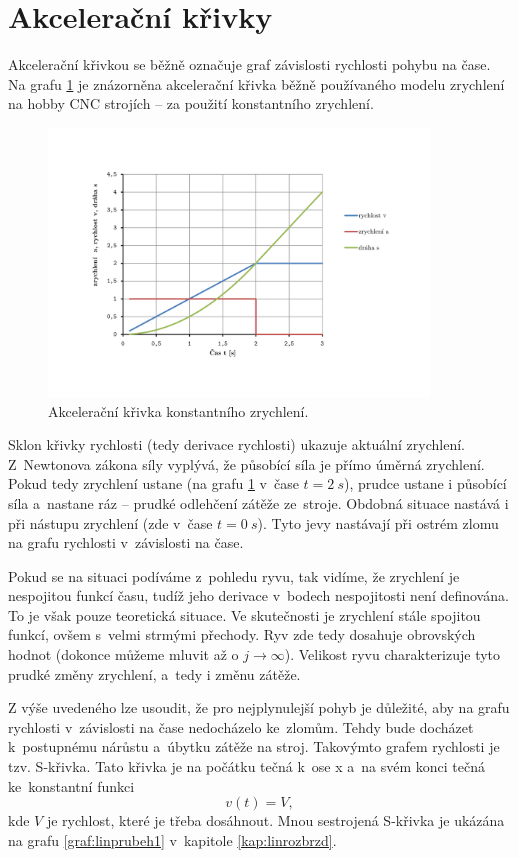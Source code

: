 	\section{Akcelerační křivky}\label{kap:akckriv}
	Akcelerační křivkou se běžně označuje graf závislosti rychlosti pohybu na čase. Na grafu \ref{graf:konstant} je znázorněna akcelerační křivka běžně používaného modelu zrychlení na hobby CNC strojích -- za použití konstantního zrychlení.
	
	\begin{figure}[h]
		\centering
		\includegraphics[width=0.9\textwidth]{img/graf_konstant.pdf}
		\caption{Akcelerační křivka konstantního zrychlení.} \label{graf:konstant}
	\end{figure}
	
	Sklon křivky rychlosti (tedy derivace rychlosti) ukazuje aktuální zrychlení. Z~Newtonova zákona síly vyplývá, že působící síla je přímo úměrná zrychlení. Pokud tedy zrychlení ustane (na grafu \ref{graf:konstant} v~čase $t=2~s$), prudce ustane i působící síla a~nastane ráz -- prudké odlehčení zátěže ze~stroje. Obdobná situace nastává i při nástupu zrychlení (zde v~čase $t=0~s$). Tyto jevy nastávají při ostrém zlomu na grafu rychlosti v~závislosti na čase.
	 
	Pokud se na situaci podíváme z~pohledu ryvu, tak vidíme, že zrychlení je nespojitou funkcí času, tudíž jeho derivace v~bodech nespojitosti není definována. To je však pouze teoretická situace. Ve skutečnosti je zrychlení stále spojitou funkcí, ovšem s~velmi strmými přechody. Ryv zde tedy dosahuje obrovských hodnot (dokonce můžeme mluvit až o $j\rightarrow\infty$). Velikost ryvu charakterizuje tyto prudké změny zrychlení, a~tedy i změnu zátěže.
	
	Z výše uvedeného lze usoudit, že pro nejplynulejší pohyb je důležité, aby na grafu rychlosti v~závislosti na čase nedocházelo ke~zlomům. Tehdy bude docházet k~postupnému nárůstu a~úbytku zátěže na stroj. Takovýmto grafem rychlosti je tzv. S-křivka. Tato křivka je na počátku tečná k~ose x a~na svém konci tečná ke~konstantní funkci
	\begin{equation}
		v(t) = V,
	\end{equation}
	kde $V$ je rychlost, které je třeba dosáhnout. Mnou sestrojená S-křivka je ukázána na grafu \ref{graf:linprubeh1} v~kapitole \ref{kap:linrozbrzd}.
	
